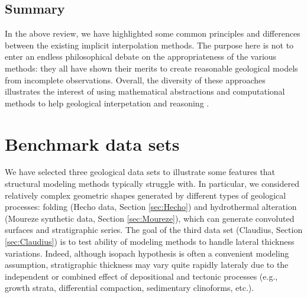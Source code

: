 \documentclass[preprint]{ring20}
\begin{document}


\subsection{Summary}

In the above review, we have highlighted some common principles and differences between the existing implicit interpolation methods. The purpose here is not to enter an endless philosophical debate on the appropriateness of the various methods: they all have shown their merits to create reasonable geological models from incomplete observations. Overall, the diversity of these approaches illustrates the interest of using mathematical abstractions and computational methods to help geological interpetation and reasoning \citep{frodeman_geological_1995}. %



\section{Benchmark data sets}\label{sec:data}

We have selected three geological data sets to illustrate some features that structural modeling methods typically struggle with. In particular, we considered relatively complex geometric shapes generated by different types of geological processes: folding (Hecho data, Section \ref{sec:Hecho}) and hydrothermal alteration (Moureze synthetic data, Section \ref{sec:Moureze}), which can generate convoluted surfaces and stratigraphic series. The goal of the third data set (Claudius, Section \ref{sec:Claudius}) is to test ability of modeling methods to handle lateral thickness variations. Indeed, although isopach hypothesis is often a convenient modeling assumption, stratigraphic thickness may vary quite rapidly lateraly due to the independent or combined effect of depositional and tectonic processes (e.g., growth strata, differential compaction, sedimentary clinoforms, etc.). 
\end{document}
